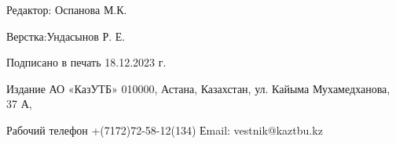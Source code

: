 \newpage

\thispagestyle{empty}
\null
\vfill
\begin{center}
Редактор: Оспанова М.К.

Верстка:Ундасынов Р. Е.

Подписано в печать 18.12.2023 г.

Издание АО «КазУТБ» 010000, Астана, Казахстан, ул. Кайыма Мухамедханова, 37 А,

Рабочий телефон +(7172)72-58-12(134) Еmail: vestnik@kaztbu.kz
\end{center}
\vfill
\null
